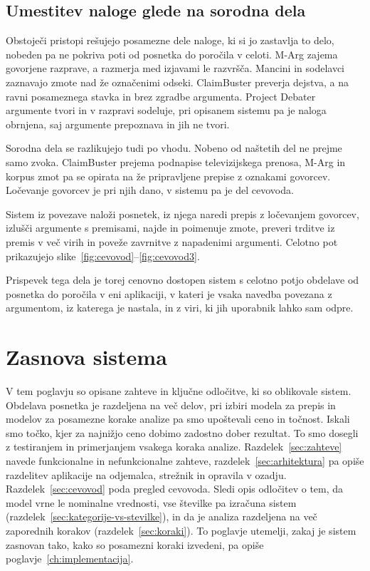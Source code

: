 \documentclass[a4paper, 12pt]{book}
\begin{document}
\section{Umestitev naloge glede na sorodna dela}
\label{sec:umestitev}

Obstoječi pristopi rešujejo posamezne dele naloge, ki si jo zastavlja to delo, nobeden pa ne pokriva poti od posnetka do poročila v celoti. M-Arg zajema govorjene razprave, a razmerja med izjavami le razvršča. Mancini in sodelavci zaznavajo zmote nad že označenimi odseki. ClaimBuster preverja dejstva, a na ravni posameznega stavka in brez zgradbe argumenta. Project Debater~\cite{slonim2021} argumente tvori in v razpravi sodeluje, pri opisanem sistemu pa je naloga obrnjena, saj argumente prepoznava in jih ne tvori.

Sorodna dela se razlikujejo tudi po vhodu. Nobeno od naštetih del ne prejme samo zvoka. ClaimBuster prejema podnapise televizijskega prenosa, M-Arg in korpus zmot pa se opirata na že pripravljene prepise z oznakami govorcev. Ločevanje govorcev je pri njih dano, v sistemu pa je del cevovoda.

Sistem iz povezave naloži posnetek, iz njega naredi prepis z ločevanjem govorcev, izlušči argumente s premisami, najde in poimenuje zmote, preveri trditve iz premis v več virih in poveže zavrnitve z napadenimi argumenti. Celotno pot prikazujejo slike~\ref{fig:cevovod}--\ref{fig:cevovod3}.

Prispevek tega dela je torej cenovno dostopen sistem s celotno potjo obdelave od posnetka do poročila v eni aplikaciji, v kateri je vsaka navedba povezana z argumentom, iz katerega je nastala, in z viri, ki jih uporabnik lahko sam odpre.

\chapter{Zasnova sistema}
\label{ch:zasnova}

V tem poglavju so opisane zahteve in ključne odločitve, ki so oblikovale sistem. Obdelava posnetka je razdeljena na več delov, pri izbiri modela za prepis in modelov za posamezne korake analize pa smo upoštevali ceno in točnost. Iskali smo točko, kjer za najnižjo ceno dobimo zadostno dober rezultat. To smo dosegli z testiranjem in primerjanjem vsakega koraka analize.  Razdelek~\ref{sec:zahteve} navede funkcionalne in nefunkcionalne zahteve, razdelek~\ref{sec:arhitektura} pa opiše razdelitev aplikacije na odjemalca, strežnik in opravila v ozadju. Razdelek~\ref{sec:cevovod} poda pregled cevovoda. Sledi opis odločitev o tem, da model vrne le nominalne vrednosti, vse številke pa izračuna sistem (razdelek~\ref{sec:kategorije-vs-stevilke}), in da je analiza razdeljena na več zaporednih korakov (razdelek~\ref{sec:koraki}). To poglavje utemelji, zakaj je sistem zasnovan tako, kako so posamezni koraki izvedeni, pa opiše poglavje~\ref{ch:implementacija}.
\end{document}
